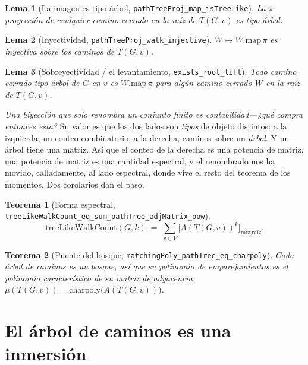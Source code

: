 \documentclass[11pt]{article}
\newtheorem{theorem}{Teorema}
\newtheorem{lemma}{Lema}
\newcommand{\lean}[1]{\texttt{#1}}
\begin{document}
\begin{lemma}[La imagen es tipo \'arbol, \lean{pathTreeProj\_map\_isTreeLike}]\label{lem:img}
La $\pi$-proyecci\'on de cualquier camino cerrado en la ra\'iz de $T(G,v)$ es tipo \'arbol.
\end{lemma}

\begin{lemma}[Inyectividad, \lean{pathTreeProj\_walk\_injective}]\label{lem:inj}
$W\mapsto W.\mathrm{map}\,\pi$ es inyectiva sobre los caminos de $T(G,v)$.
\end{lemma}

\begin{lemma}[Sobreyectividad / el levantamiento, \lean{exists\_root\_lift}]\label{lem:surj}
Todo camino cerrado tipo \'arbol de $G$ en $v$ es $W.\mathrm{map}\,\pi$ para alg\'un camino cerrado $W$
en la ra\'iz de $T(G,v)$.
\end{lemma}

\emph{Una biyecci\'on que solo renombra un conjunto finito es contabilidad---¿qu\'e compra entonces
esta?} Su valor es que los dos lados son \emph{tipos} de objeto distintos: a la izquierda, un conteo
combinatorio; a la derecha, caminos sobre un \emph{\'arbol}. Y un \'arbol tiene una matriz. As\'i que el
conteo de la derecha es una potencia de matriz, una potencia de matriz es una cantidad espectral, y el
renombrado nos ha movido, calladamente, al lado espectral, donde vive el resto del teorema de los
momentos. Dos corolarios dan el paso.

\begin{theorem}[Forma espectral, \lean{treeLikeWalkCount\_eq\_sum\_pathTree\_adjMatrix\_pow}]
\label{thm:spectral}
\[
  \mathrm{treeLikeWalkCount}(G,k)\;=\;\sum_{v\in V}\bigl[A(T(G,v))^{k}\bigr]_{\text{ra\'iz},\text{ra\'iz}}.
\]
\end{theorem}

\begin{theorem}[Puente del bosque, \lean{matchingPoly\_pathTree\_eq\_charpoly}]\label{thm:forest}
Cada \'arbol de caminos es un bosque, as\'i que su polinomio de emparejamientos es el polinomio
caracter\'istico de su matriz de adyacencia: $\mu(T(G,v))=\mathrm{charpoly}\bigl(A(T(G,v))\bigr)$.
\end{theorem}

\section{El \'arbol de caminos es una inmersi\'on}
\label{sec:inj}
\end{document}
